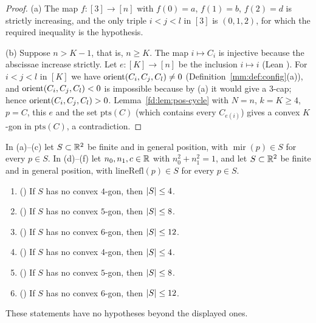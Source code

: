 \begin{proof}
(a) The map $f:[3]\to[n]$ with $f(0)=a$, $f(1)=b$, $f(2)=d$ is strictly increasing, and the only triple
$i<j<l$ in $[3]$ is $(0,1,2)$, for which the required inequality is the hypothesis.

(b) Suppose $n>K-1$, that is, $n\ge K$. The map $i\mapsto C_i$ is injective because the abscissae
increase strictly. Let $e:[K]\to[n]$ be the inclusion $i\mapsto i$ (Lean ). For
$i<j<l$ in $[K]$ we have $\operatorname{orient}(C_i,C_j,C_l)\ne0$ (Definition~\ref{mm:def:config}(a)), and
$\operatorname{orient}(C_i,C_j,C_l)<0$ is impossible because by (a) it would give a $3$-cap; hence
$\operatorname{orient}(C_i,C_j,C_l)>0$. Lemma~\ref{fd:lem:pos-cycle} with $N=n$, $k=K\ge4$, $p=C$, this $e$ and the set
$\mathrm{pts}(C)$ (which contains every $C_{e(i)}$) gives a convex $K$-gon in $\mathrm{pts}(C)$, a
contradiction.
\end{proof}

\begin{theorem}[$k=4,5,6$; \leanref{MirrorOdd.mirror_four}{MIRRORETV/lean/MirrorMain.lean:2019}, \leanref{MirrorOdd.mirror_five}{MIRRORETV/lean/MirrorMain.lean:2040}, \leanref{MirrorOdd.mirror_six}{MIRRORETV/lean/MirrorMain.lean:2129}, \leanref{MirrorOdd.mirror_four_line}{MIRRORETV/lean/MirrorMain.lean:2159}, \leanref{MirrorOdd.mirror_five_line}{MIRRORETV/lean/MirrorMain.lean:2165}, \leanref{MirrorOdd.mirror_six_line}{MIRRORETV/lean/MirrorMain.lean:2171}]\label{mm:thm:small}
In (a)--(c) let $S\subset\mathbb R^2$ be finite and in general position, with $\operatorname{mir}(p)\in S$ for
every $p\in S$. In (d)--(f) let $n_0,n_1,c\in\mathbb R$ with $n_0^2+n_1^2=1$, and let $S\subset\mathbb R^2$ be finite
and in general position, with $\mathrm{lineRefl}(p)\in S$ for every $p\in S$.
\begin{enumerate}[label=(\alph*)]
\item () If $S$ has no convex $4$-gon, then $\lvert S\rvert\le4$.
\item () If $S$ has no convex $5$-gon, then $\lvert S\rvert\le8$.
\item () If $S$ has no convex $6$-gon, then $\lvert S\rvert\le12$.
\item () If $S$ has no convex $4$-gon, then $\lvert S\rvert\le4$.
\item () If $S$ has no convex $5$-gon, then $\lvert S\rvert\le8$.
\item () If $S$ has no convex $6$-gon, then $\lvert S\rvert\le12$.
\end{enumerate}
These statements have no hypotheses beyond the displayed ones.
\end{theorem}

